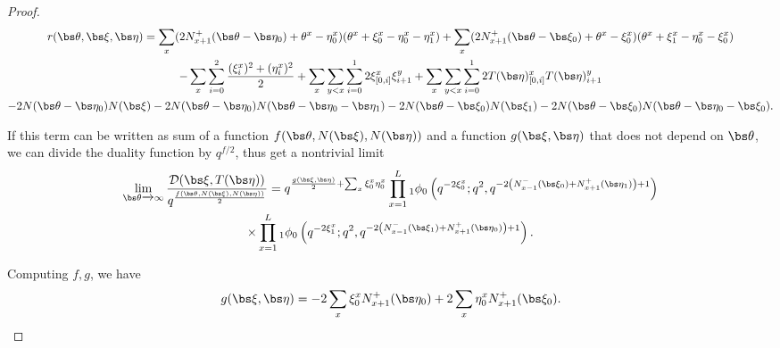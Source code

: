 \begin{proof}
\begin{multline}
  r(\bs\theta,\bs\xi,\bs\eta) =    \sum_x (2N_{x+1}^+(\bs\theta-\bs\eta_0)+\theta^x-\eta_0^x)(\theta^x+\xi_0^x-\eta_0^x-\eta_1^x)
        +\sum_x (2N_{x+1}^+(\bs\theta-\bs\xi_0)+\theta^x-\xi_0^x)(\theta^x+\xi_1^x-\eta_0^x-\xi_0^x)\\
    -\sum_x\sum_{i=0}^2\frac{(\xi_i^x)^2+(\eta_i^x)^2}{2}
        +\sum_x\sum_{y<x}\sum_{i=0}^12\xi^x_{[0,i]}\xi_{i+1}^y +\sum_x\sum_{y<x}\sum_{i=0}^12T(\bs\eta)^x_{[0,i]}T(\bs\eta)_{i+1}^y\\ -2N(\bs\theta-\bs\eta_0)N(\bs\xi)-2N(\bs\theta-\bs\eta_0)N(\bs\theta-\bs\eta_0-\bs\eta_1)
     -2N(\bs\theta-\bs\xi_0)N(\bs\xi_1)-2N(\bs\theta-\bs\xi_0)N(\bs\theta-\bs\eta_0-\bs\xi_0)   .   \end{multline}


If this term can be written as  sum of a function $f(\bs\theta,N(\bs\xi),N(\bs\eta))$ and a function $g(\bs\xi,\bs\eta)$ that does not depend on $\bs\theta$, we can divide the duality function by $q^{f/2}$, thus get a nontrivial limit 
\begin{multline}
  \lim_{\bs\theta\xrightarrow{}\infty} \frac{\mathcal{D}(\bs\xi,T(\bs\eta)) }{q^{\frac{f(\bs\theta,N(\bs\xi),N(\bs\eta))}{2}}} = q^{\frac{g(\bs\xi,\bs\eta)}{2}+\sum_x\xi_0^x\eta_0^x} \prod_{x=1}^L{}_1\phi_0\left(q^{-2\xi_0^x};q^2,q^{-2\left(N_{x-1}^-(\bs\xi_0)+N_{x+1}^+(\bs\eta_1)\right)+1}\right)\\
   \times \prod_{x=1}^L{}_1\phi_0\left(q^{-2\xi_1^x};q^2,q^{-2\left(N_{x-1}^-(\bs\xi_1)+N_{x+1}^+(\bs\eta_0)\right)+1}\right).  
\end{multline}


Computing $f,g$, we have 
\begin{equation}\label{eq:2}
    \begin{split}
        g(\bs\xi,\bs\eta)%
        =-2\sum_x\xi_0^xN_{x+1}^+(\bs\eta_0)+2\sum_x\eta_0^xN_{x+1}^+(\bs\xi_0).
    \end{split}
\end{equation}
\end{proof}

